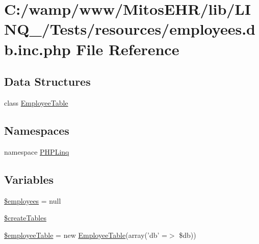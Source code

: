 \hypertarget{employees_8db_8inc_8php}{\section{\-C\-:/wamp/www/\-Mitos\-E\-H\-R/lib/\-L\-I\-N\-Q\-\_/\-Tests/resources/employees.db.\-inc.\-php \-File \-Reference}
\label{employees_8db_8inc_8php}
}
\subsection*{\-Data \-Structures}
\begin{DoxyCompactItemize}
\item 
class \hyperlink{class_employee_table}{\-Employee\-Table}
\end{DoxyCompactItemize}
\subsection*{\-Namespaces}
\begin{DoxyCompactItemize}
\item 
namespace \hyperlink{namespace_p_h_p_linq}{\-P\-H\-P\-Linq}
\end{DoxyCompactItemize}
\subsection*{\-Variables}
\begin{DoxyCompactItemize}
\item 
\hyperlink{employees_8db_8inc_8php_a598c06abe9d65a9d2990e39693ce2c27}{\$employees} = null
\item 
\hyperlink{employees_8db_8inc_8php_a357d57bd32f1b2ca29a9674741f44fd3}{\$create\-Tables}
\item 
\hyperlink{employees_8db_8inc_8php_a70a2050a9df43e30a61a4d25945cf666}{\$employee\-Table} = new \hyperlink{class_employee_table}{\-Employee\-Table}(array('db' =$>$ \$db))
\end{DoxyCompactItemize}


